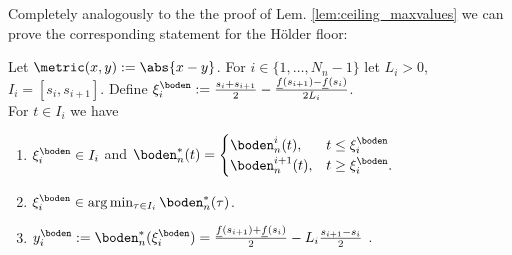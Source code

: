 Completely analogously to the the proof of Lem. \ref{lem:ceiling_maxvalues} we can prove the corresponding statement for the H\"older floor:
\begin{lem} \label{lem:floor_minvalues}
Let $\metric(x,y) := \abs{x-y}$.
For $i \in \{1,\ldots,N_n-1\}$ let  $L_i > 0$, $I_i = [s_i,s_{i+1}]$.
Define $\xi^{\boden}_i :=  \frac{s_i+s_{i+1}}{2}- \frac{\underline f(s_{i+1}) - \underline f(s_i)}{2 L_i}  $.\\
For $t \in I_i$ we have 
\begin{enumerate}
\item $\xi^{\boden}_i \in I_i$ and  $\boden^*_n(t) = 
 \begin{cases}  
 \boden^i_n (t), & t \leq \xi^\boden_i \\
 \boden^{i+1}_n(t), & t \geq \xi^\boden_i.
 \end{cases}$
\item $\xi^{\boden}_i \in \arg\min_{\tau \in I_i} \boden^*_n (\tau)$.
\item  $y^{\boden}_i := \boden_n^*(\xi^{\boden}_i) = \frac{\underline f(s_{i+1}) +\underline f(s_i)}{2} - L_i \frac{s_{i+1}-s_i}{2}$ .
\end{enumerate}


\end{lem}
